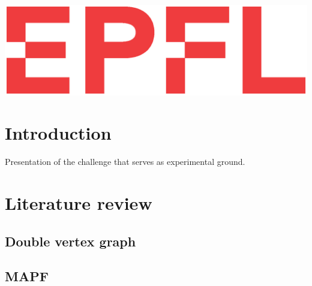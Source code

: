 \documentclass[14pt,a4paper]{article}
\theoremstyle{definition}
\numberwithin{equation}{subsection}
\begin{document}
\begin{titlepage}

 \includegraphics[width=0.5\linewidth]{img/logo.eps}\\[1cm] %
 

\vfill %


\end{titlepage}




\newpage





\tableofcontents
{}
\newpage






\section*{Introduction}
Presentation of the challenge that serves as experimental ground.



\newpage
\section{Literature review}
\subsection{Double vertex graph}
\subsection{MAPF}
\end{document}
